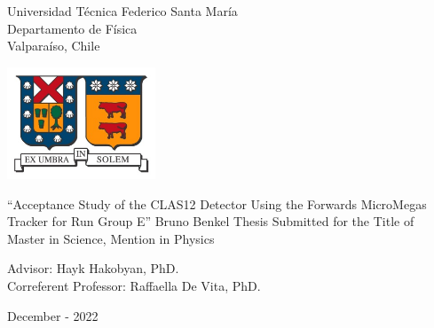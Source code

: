 \begin{titlepage}
\begin{center}
    \noindent
    \fontsize{18}{22}\selectfont Universidad T\'ecnica Federico Santa Mar\'ia \\
    \fontsize{16}{19}\selectfont Departamento de F\'isica \\
    \fontsize{16}{19}\selectfont Valpara\'iso, Chile \\
    \vspace{1.5cm}

    \includegraphics[width=4.41cm,height=3.34cm]{00firstpages/img/utfsm_shield.jpg}
    \vspace{1.5cm}

    \fontsize{20}{24}\selectfont ``Acceptance Study of the CLAS12 Detector Using the Forwards MicroMegas Tracker for Run Group E''
    \vfill
    \fontsize{16}{19}\selectfont Bruno Benkel
    \vfill
    \fontsize{16}{19}\selectfont Thesis Submitted for the Title of \\ Master in Science, Mention in Physics
    \vspace{1.5cm}

    \fontsize{14}{17}\selectfont Advisor: Hayk Hakobyan, PhD. \\
    \fontsize{14}{17}\selectfont Correferent Professor: Raffaella De Vita, PhD. %
    \vspace{2.5cm}

    \fontsize{14}{17}\selectfont December - 2022
\end{center}
\end{titlepage}

       \pagebreak
 \pagebreak
         \pagebreak
         \pagebreak
\tableofcontents                        \pagebreak
{} {}
\listoffigures                          \pagebreak
